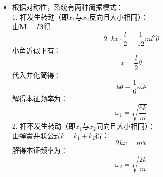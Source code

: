 \documentclass[a4paper,fontset=windows]{ctexart}
\begin{document}
\begin{itemize}
        \item[3.3.(2)]
        根据对称性，系统有两种简振模式： \\
        1. 杆发生转动（即$x_1$与$x_2$反向且大小相同）： \\
        由$\boldsymbol{M} = I\boldsymbol{\beta}$得：
        \[
        2\cdot kx\cdot\frac{l}{2} = \frac{1}{12}ml^2\ddot{\theta}
        \]
        小角近似下有：
        \[
        x = \frac{l}{2}\theta
        \]
        代入并化简得：
        \[
        k\theta = \frac{1}{6}m\ddot{\theta}
        \]
        解得本征频率为：
        \[
        \omega_1 = \sqrt{\frac{6k}{m}}
        \]
        2. 杆不发生转动（即$x_1$与$x_2$同向且大小相同）： \\
        由弹簧并联公式$k = k_1+k_2$得：
        \[
        2kx = m\ddot{x}
        \]
        解得本征频率为：
        \[
        \omega_2 = \sqrt{\frac{2k}{m}}
        \]
        \bigskip


\end{itemize}
\end{document}
